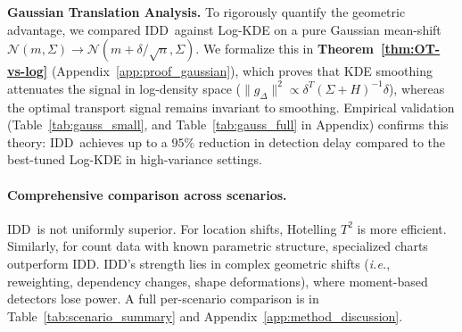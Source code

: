 \documentclass{article}
\newcommand{\ie}{\textit{i.e.}, \xspace}
\newcommand{\algoname}{\textsc{IDD}\xspace}
\theoremstyle{plain}
\theoremstyle{definition}
\theoremstyle{remark}
\begin{document}
\textbf{Gaussian Translation Analysis.}
To rigorously quantify the geometric advantage, we compared \algoname\ against Log-KDE on a pure Gaussian mean-shift $\mathcal N(m,\Sigma) \to \mathcal N(m+\delta/\sqrt{n}, \Sigma)$.
We formalize this in \textbf{Theorem~\ref{thm:OT-vs-log}} (Appendix~\ref{app:proof_gaussian}), which proves that KDE smoothing attenuates the signal in log-density space ($\|g_\Delta\|^2 \propto \delta^T(\Sigma+H)^{-1}\delta$), whereas the optimal transport signal remains invariant to smoothing.
Empirical validation (Table~\ref{tab:gauss_small}, and Table~\ref{tab:gauss_full} in Appendix) confirms this theory: \algoname\ achieves up to a $95\%$ reduction in detection delay compared to the best-tuned Log-KDE in high-variance settings.

\paragraph{Comprehensive comparison across scenarios.}
\algoname\ is not uniformly superior. 
For location shifts, Hotelling $T^2$ is more efficient. 
Similarly, for count data with known parametric structure, specialized charts outperform \algoname. \algoname's strength lies in complex geometric shifts (\ie reweighting, dependency changes, shape deformations), where moment-based detectors lose power. A full per-scenario comparison is in Table~\ref{tab:scenario_summary} and Appendix~\ref{app:method_discussion}.



\end{document}
